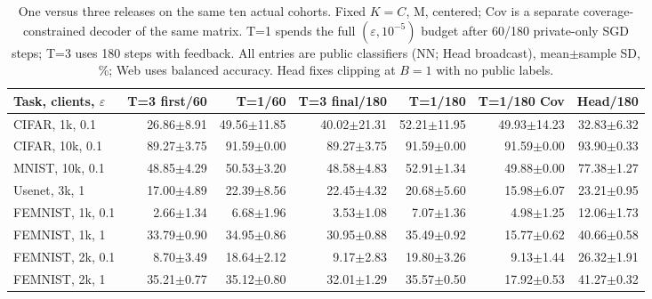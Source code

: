 \begin{table}[t]
\caption{One versus three releases on the same ten actual cohorts. Fixed $K=C$, M, centered; Cov is a separate coverage-constrained decoder of the same matrix. T=1 spends the full $(\varepsilon,10^{-5})$ budget after 60/180 private-only SGD steps; T=3 uses 180 steps with feedback. All entries are public classifiers (NN; Head broadcast), mean$\pm$sample SD, \%; Web uses balanced accuracy. Head fixes clipping at $B=1$ with no public labels.}
\label{tab:rounds}\small
\centering
\begin{tabular}{@{}lrrrrrr@{}}\toprule
Task, clients, $\varepsilon$ & T=3 first/60 & T=1/60 & T=3 final/180 & T=1/180 & T=1/180 Cov & Head/180 \\
\midrule
CIFAR, 1k, 0.1 & 26.86$\pm$8.91 & 49.56$\pm$11.85 & 40.02$\pm$21.31 & 52.21$\pm$11.95 & 49.93$\pm$14.23 & 32.83$\pm$6.32 \\
CIFAR, 10k, 0.1 & 89.27$\pm$3.75 & 91.59$\pm$0.00 & 89.27$\pm$3.75 & 91.59$\pm$0.00 & 91.59$\pm$0.00 & 93.90$\pm$0.33 \\
MNIST, 10k, 0.1 & 48.85$\pm$4.29 & 50.53$\pm$3.20 & 48.58$\pm$4.83 & 52.91$\pm$1.34 & 49.88$\pm$0.00 & 77.38$\pm$1.27 \\
Usenet, 3k, 1 & 17.00$\pm$4.89 & 22.39$\pm$8.56 & 22.45$\pm$4.32 & 20.68$\pm$5.60 & 15.98$\pm$6.07 & 23.21$\pm$0.95 \\
FEMNIST, 1k, 0.1 & 2.66$\pm$1.34 & 6.68$\pm$1.96 & 3.53$\pm$1.08 & 7.07$\pm$1.36 & 4.98$\pm$1.25 & 12.06$\pm$1.73 \\
FEMNIST, 1k, 1 & 33.79$\pm$0.90 & 34.95$\pm$0.86 & 30.95$\pm$0.88 & 35.49$\pm$0.92 & 15.77$\pm$0.62 & 40.66$\pm$0.58 \\
FEMNIST, 2k, 0.1 & 8.70$\pm$3.49 & 18.64$\pm$2.12 & 9.17$\pm$2.83 & 19.80$\pm$3.26 & 9.13$\pm$1.44 & 26.32$\pm$1.91 \\
FEMNIST, 2k, 1 & 35.21$\pm$0.77 & 35.12$\pm$0.80 & 32.01$\pm$1.29 & 35.57$\pm$0.50 & 17.92$\pm$0.53 & 41.27$\pm$0.32 \\
\bottomrule\end{tabular}
\end{table}
